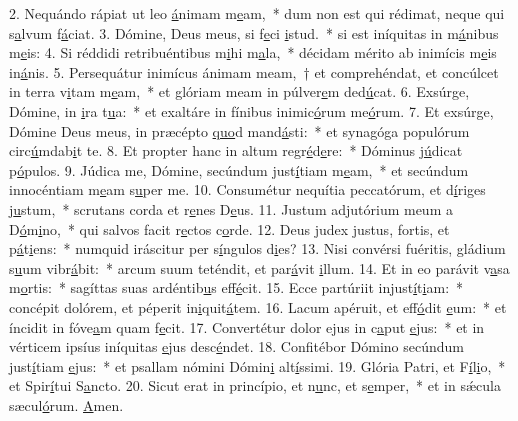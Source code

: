2. Nequándo rápiat ut leo \uline{á}nimam m\uline{e}am,~* dum non est qui rédimat, neque qui s\uline{a}lvum f\uline{á}ciat.
3. Dómine, Deus meus, si f\uline{e}ci \uline{i}stud.~* si est iníquitas in m\uline{á}nibus m\uline{e}is:
4. Si réddidi retribuéntibus m\uline{i}hi m\uline{a}la,~* décidam mérito ab inimícis m\uline{e}is in\uline{á}nis.
5. Persequátur inimícus ánimam meam,~† et comprehéndat, et concúlcet in terra v\uline{i}tam m\uline{e}am,~* et glóriam meam in púlver\uline{e}m ded\uline{ú}cat.
6. Exsúrge, Dómine, in \uline{i}ra t\uline{u}a:~* et exaltáre in fínibus inimic\uline{ó}rum me\uline{ó}rum.
7. Et exsúrge, Dómine Deus meus, in præcépto \uline{quo}d mand\uline{á}sti:~* et synagóga populórum circ\uline{ú}mdab\uline{i}t te.
8. Et propter hanc in altum regr\uline{é}d\uline{e}re:~* Dóminus j\uline{ú}dicat p\uline{ó}pulos.
9. Júdica me, Dómine, secúndum just\uline{í}tiam m\uline{e}am,~* et secúndum innocéntiam m\uline{e}am s\uline{u}per me.
10. Consumétur nequítia peccatórum, et d\uline{í}riges j\uline{u}stum,~* scrutans corda et r\uline{e}nes D\uline{e}us.
11. Justum adjutórium meum a D\uline{ó}m\uline{i}no,~* qui salvos facit r\uline{e}ctos c\uline{o}rde.
12. Deus judex justus, fortis, et p\uline{á}t\uline{i}ens:~* numquid iráscitur per s\uline{í}ngulos d\uline{i}es?
13. Nisi convérsi fuéritis, gládium s\uline{u}um vibr\uline{á}bit:~* arcum suum teténdit, et par\uline{á}vit \uline{i}llum.
14. Et in eo parávit v\uline{a}sa m\uline{o}rtis:~* sagíttas suas ardéntib\uline{u}s eff\uline{é}cit.
15. Ecce partúriit injust\uline{í}t\uline{i}am:~* concépit dolórem, et péperit in\uline{i}quit\uline{á}tem.
16. Lacum apéruit, et eff\uline{ó}dit \uline{e}um:~* et íncidit in fóve\uline{a}m quam f\uline{e}cit.
17. Convertétur dolor ejus in c\uline{a}put \uline{e}jus:~* et in vérticem ipsíus iníquitas \uline{e}jus desc\uline{é}ndet.
18. Confitébor Dómino secúndum just\uline{í}tiam \uline{e}jus:~* et psallam nómini Dómin\uline{i} alt\uline{í}ssimi.
19. Glória Patri, et F\uline{í}l\uline{i}o,~* et Spir\uline{í}tui S\uline{a}ncto.
20. Sicut erat in princípio, et n\uline{u}nc, et s\uline{e}mper,~* et in sǽcula sæcul\uline{ó}rum. \uline{A}men.
